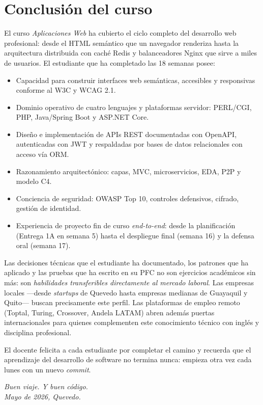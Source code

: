 \documentclass[11pt,a4paper,openany]{book}
\begin{document}
\section{Conclusión del curso}

El curso \emph{Aplicaciones Web} ha cubierto el ciclo completo del
desarrollo web profesional: desde el HTML semántico que un navegador
renderiza hasta la arquitectura distribuida con caché Redis y
balanceadores Nginx que sirve a miles de usuarios. El estudiante que
ha completado las 18 semanas posee:

\begin{itemize}
\item Capacidad para construir interfaces web semánticas, accesibles
y responsivas conforme al W3C y WCAG 2.1.
\item Dominio operativo de cuatro lenguajes y plataformas servidor:
PERL/CGI, PHP, Java/Spring Boot y ASP.NET Core.
\item Diseño e implementación de APIs REST documentadas con OpenAPI,
autenticadas con JWT y respaldadas por bases de datos relacionales
con acceso vía ORM.
\item Razonamiento arquitectónico: capas, MVC, microservicios, EDA,
P2P y modelo C4.
\item Conciencia de seguridad: OWASP Top 10, controles defensivos,
cifrado, gestión de identidad.
\item Experiencia de proyecto fin de curso \emph{end-to-end}: desde
la planificación (Entrega 1A en semana 5) hasta el despliegue final
(semana 16) y la defensa oral (semana 17).
\end{itemize}

Las decisiones técnicas que el estudiante ha documentado, los patrones
que ha aplicado y las pruebas que ha escrito en su PFC no son
ejercicios académicos sin más: son \emph{habilidades transferibles
directamente al mercado laboral}. Las empresas locales ---desde
\emph{startups} de Quevedo hasta empresas medianas de Guayaquil y
Quito--- buscan precisamente este perfil. Las plataformas de empleo
remoto (Toptal, Turing, Crossover, Andela LATAM) abren además puertas
internacionales para quienes complementen este conocimiento técnico
con inglés y disciplina profesional.

El docente felicita a cada estudiante por completar el camino y
recuerda que el aprendizaje del desarrollo de software no termina
nunca: empieza otra vez cada lunes con un nuevo \emph{commit}.

\hfill \emph{Buen viaje. Y buen código.}\\
\hfill \emph{Mayo de 2026, Quevedo.}
\end{document}
